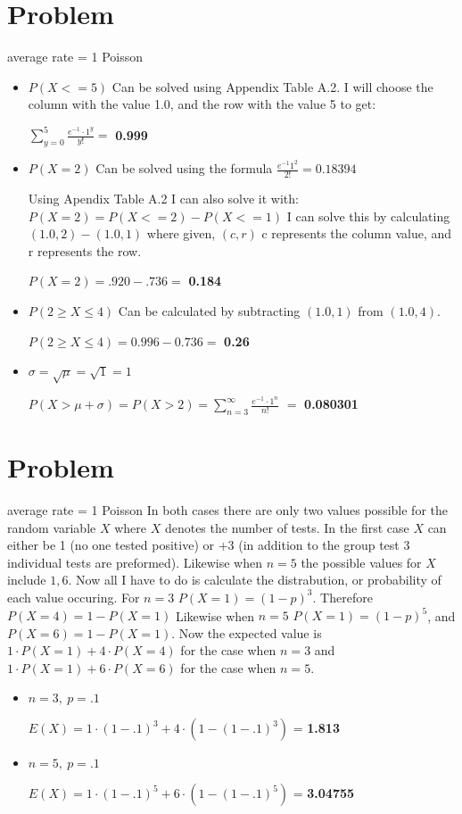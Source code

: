 \documentclass[12pt, letterpaper]{article}
\begin{document}
\section{Problem}
average rate = 1
Poisson
\begin{itemize}
	\item $P(X <= 5)$ Can be solved using Appendix Table A.2. I will choose the column with the value 1.0, and the row with the value 5 to get:

	$\sum_{y=0}^{5} \frac{e^{-1}\cdot 1^{y}}{y!} = $ \textbf{0.999}
	\item $P(X = 2)$ Can be solved using the formula $\frac{e^{-1}1^{2}}{2!} = 0.18394$

	Using Apendix Table A.2 I can also solve it with:
	$P(X = 2) = P(X <= 2) - P(X <= 1)$ I can solve this by calculating $(1.0,2) - (1.0,1)$ where given, $(c,r)$ c represents the column value, and r represents the row.

	$P(X = 2) = .920 - .736  = $ \textbf{0.184}
	\item $P(2 \ge X \le 4)$ Can be calculated by subtracting $(1.0, 1)$ from $(1.0, 4)$.

	$ P(2 \ge X \le 4) = 0.996 - 0.736 = $ \textbf{0.26}
	\item $\sigma = \sqrt{\mu} = \sqrt{1} = 1$

	$P(X > \mu + \sigma) = P(X > 2) = \sum_{n=3}^{\infty} \frac{e^{-1} \cdot 1^{n}}{n!}$
	$ = $ \textbf{0.080301}


\end{itemize}
\section{Problem}
average rate = 1
Poisson
In both cases there are only two values possible for the random variable $X$ where $X$ denotes the number of tests.
In the first case $X$ can either be 1 (no one tested positive) or +3 (in addition to the group test 3 individual tests are preformed). Likewise when $n = 5$ the possible values for $X$ include ${1, 6}$.
Now all I have to do is calculate the distrabution, or probability of each value occuring.
For $n = 3$ $P(X = 1) = (1-p)^{3}$. Therefore $P(X = 4) = 1 - P(X = 1)$
Likewise when $n = 5$ $P(X = 1) = (1-p)^{5}$, and $P(X = 6) = 1 - P(X = 1)$.
Now the expected value is $1 \cdot P(X = 1) + 4 \cdot P(X = 4)$ for the case when $n = 3$ and
$1 \cdot P(X = 1) + 6 \cdot P(X = 6)$ for the case when $n = 5$.
\begin{itemize}
	\item $n = 3,\ p = .1$

	$E(X) = 1 \cdot (1-.1)^{3} + 4 \cdot (1-(1-.1)^{3})$ = \textbf{1.813}
	\item $n = 5,\ p = .1$

	$E(X) = 1 \cdot (1-.1)^{5} + 6 \cdot (1-(1-.1)^{5})$ = \textbf{3.04755}
\end{itemize}
\end{document}
